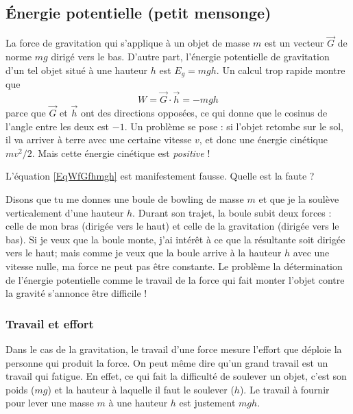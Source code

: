 \documentclass[a4paper,12pt]{book}
\theoremstyle{mes_exemples}	\newtheorem{exemple}[numtho]{Exemple}
\theoremstyle{mes_tho}
\newcommand{\fG}{\overrightarrow{G}}
\newcommand{\fh}{\overrightarrow{h}}
\begin{document}
\subsection{Énergie potentielle (petit mensonge)}

La force de gravitation qui s'applique à un objet de masse $m$ est un vecteur $\fG$ de norme $mg$ dirigé vers le bas. D'autre part,  l'énergie potentielle de gravitation d'un tel objet situé à une hauteur $h$ est $E_g=mgh$. Un calcul trop rapide montre que 
\begin{equation}		\label{EqWfGfhmgh}
	W=\fG\cdot\fh=-mgh
\end{equation}
parce que $\fG$ et $\fh$ ont des directions opposées, ce qui donne que le cosinus de l'angle entre les deux est $-1$. Un problème se pose : si l'objet retombe sur le sol, il va arriver à terre avec une certaine vitesse $v$, et donc une énergie cinétique $mv^2/2$. Mais cette énergie cinétique est \emph{positive} !

\begin{probleme}
	L'équation \eqref{EqWfGfhmgh} est manifestement fausse. Quelle est la faute ?
\end{probleme}

Disons que tu me donnes une boule de bowling de masse $m$ et que je la soulève verticalement d'une hauteur $h$. Durant son trajet, la boule subit deux forces : celle de mon bras (dirigée vers le haut) et celle de la gravitation (dirigée vers le bas). Si je veux que la boule monte, j'ai intérêt à ce que la résultante soit dirigée vers le haut; mais comme je veux que la boule arrive à la hauteur $h$ avec une vitesse nulle, ma force ne peut pas être constante. Le problème la détermination de l'énergie potentielle comme le travail de la force qui fait monter l'objet contre la gravité s'annonce être difficile !

\subsubsection{Travail et effort}

Dans le cas de la gravitation, le travail d'une force mesure l'effort que déploie la personne qui produit la force. On peut même dire qu'un grand travail est un travail qui fatigue. En effet, ce qui fait la difficulté de soulever un objet, c'est son poids ($mg$) et la hauteur à laquelle il faut le soulever ($h$). Le travail à fournir pour lever une masse $m$ à une hauteur $h$ est justement $mgh$.
\end{document}
